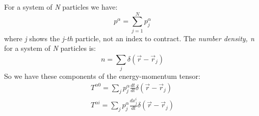 For a system of \emph{N} particles we have: 
\[
p^{\alpha } = \sum_{j=1}^{N}{p^{\alpha }_{j}}	 
\]
where \emph{j} shows the \emph{j-th} particle, not an index to contract.
The \emph{number density, n} for a system of \emph{N} particles is:
\[
n = \sum_{j}^{}{\delta\left( \vec{r}-\vec{r}_{j} \right)}
\]
So we have these components of the energy-momentum tensor:
\begin{gather*}
T^{\alpha 0} = \sum_{j}^{}{p^{\alpha }_{j} \frac{dt}{dt} \delta\left( \vec{r}-\vec{r}_{j} \right)} \\
T^{\alpha i} = \sum_{j}^{}{p^{\alpha }_{j} \frac{dx^{i}_{j}}{dt} \delta\left( \vec{r}-\vec{r}_{j} \right) }
\end{gather*}
 




